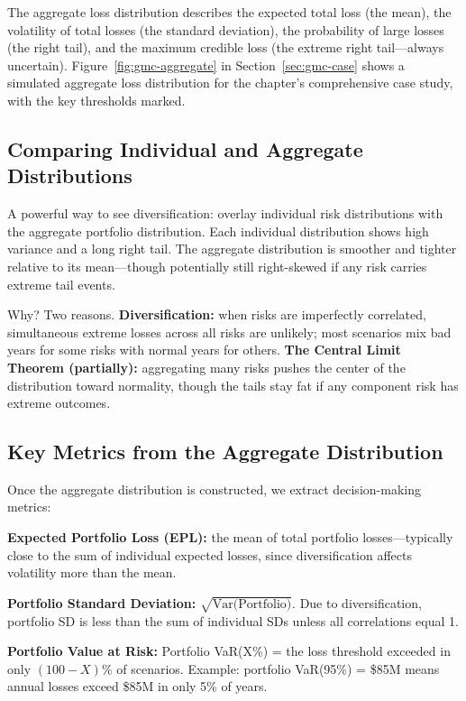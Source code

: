 \documentclass[11pt,openany]{book}
\begin{document}
The aggregate loss distribution describes the expected total loss (the mean),
the volatility of total losses (the standard deviation), the probability of
large losses (the right tail), and the maximum credible loss (the extreme
right tail---always uncertain). Figure~\ref{fig:gmc-aggregate} in
Section~\ref{sec:gmc-case} shows a simulated aggregate loss distribution for
the chapter's comprehensive case study, with the key thresholds marked.

\subsection{Comparing Individual and Aggregate Distributions}
\label{subsec:comparing-distributions}

A powerful way to see diversification: overlay individual risk distributions
with the aggregate portfolio distribution. Each individual distribution shows
high variance and a long right tail. The aggregate distribution is smoother
and tighter relative to its mean---though potentially still right-skewed if
any risk carries extreme tail events.

Why? Two reasons. \textbf{Diversification:} when risks are imperfectly
correlated, simultaneous extreme losses across all risks are unlikely; most
scenarios mix bad years for some risks with normal years for others.
\textbf{The Central Limit Theorem (partially):} aggregating many risks pushes
the center of the distribution toward normality, though the tails stay fat if
any component risk has extreme outcomes.

\subsection{Key Metrics from the Aggregate Distribution}
\label{subsec:key-metrics}

Once the aggregate distribution is constructed, we extract decision-making
metrics:

\textbf{Expected Portfolio Loss (EPL):} the mean of total portfolio
losses---typically close to the sum of individual expected losses, since
diversification affects volatility more than the mean.

\textbf{Portfolio Standard Deviation:} \(\sqrt{\text{Var(Portfolio)}}\). Due
to diversification, portfolio SD is less than the sum of individual SDs unless
all correlations equal 1.

\textbf{Portfolio Value at Risk:} Portfolio VaR(X\%) = the loss threshold
exceeded in only \((100 - X)\%\) of scenarios. Example: portfolio VaR(95\%) =
\$85M means annual losses exceed \$85M in only 5\% of years.
\end{document}
